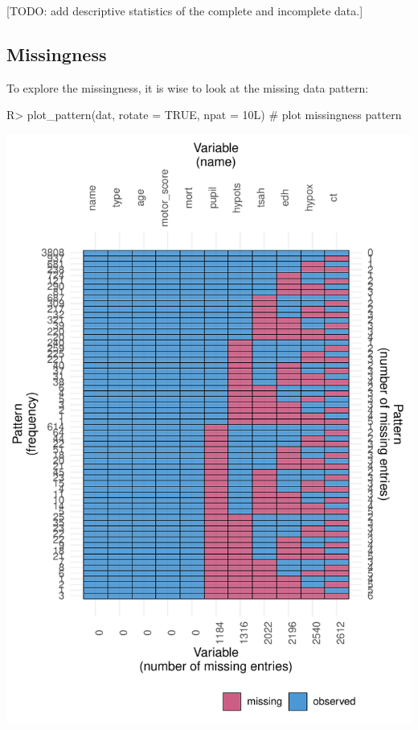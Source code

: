 \documentclass[
]{jss}
\begin{document}
{[}TODO: add descriptive statistics of the complete and incomplete
data.{]}

\hypertarget{missingness}{%
\subsection{Missingness}\label{missingness}}

To explore the missingness, it is wise to look at the missing data
pattern:

\begin{CodeChunk}
\begin{CodeInput}
R> plot_pattern(dat, rotate = TRUE, npat = 10L)  # plot missingness pattern
\end{CodeInput}


\begin{center}\includegraphics{Imputation_of_Incomplete_Multilevel_Data_files/figure-latex/pattern-1} \end{center}

\end{CodeChunk}
\end{document}
